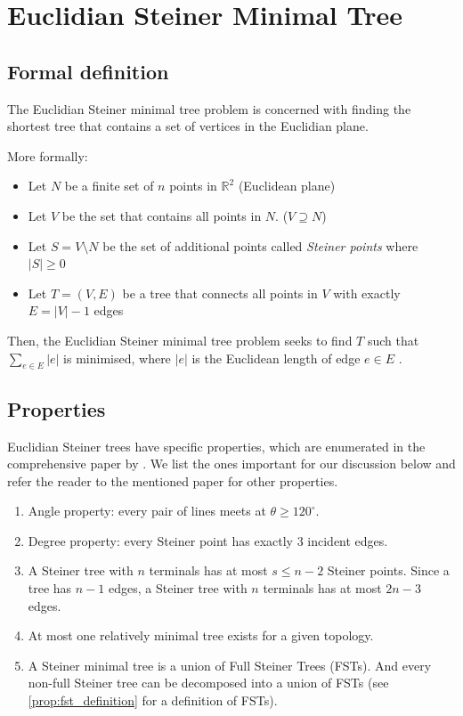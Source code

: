 \documentclass{l4proj}
\begin{document}
\section{Euclidian Steiner Minimal Tree}

\subsection{Formal definition}
The Euclidian Steiner minimal tree problem is concerned with finding the shortest tree that contains a set of vertices in the Euclidian plane.

More formally:
\begin{itemize}
    \item Let $N$ be a finite set of $n$ points in $\mathbb{R}^2$ (Euclidean plane)
    \item Let $V$ be the set that contains all points in $N$. ($V \supseteq N$)
    \item Let $S = V \setminus N$ be the set of additional points called \textit{Steiner points} where $|S| \geq 0$
    \item Let $T = (V, E)$ be a tree that connects all points in $V$ with exactly $E = |V| - 1$ edges
\end{itemize}

Then, the Euclidian Steiner minimal tree problem seeks to find $T$ such that $\sum_{e \in E} |e|$ is minimised, where $|e|$ is the Euclidean length of edge $e \in E$ \citep{Brazil2014}.

\subsection{Properties}
\label{sec:esmt_properties}
Euclidian Steiner trees have specific properties, which are enumerated in the comprehensive paper by \cite{Gilbert1968SteinerMT}. We list the ones important for our discussion below and refer the reader to the mentioned paper for other properties.

\begin{enumerate}
    \item Angle property: every pair of lines meets at $\theta \geq 120^\circ$.
    \item Degree property: every Steiner point has exactly 3 incident edges.
    \item \label{prop:esmt_fst} A Steiner tree with $n$ terminals has at most $s \leq n - 2$ Steiner points. Since a tree has $n - 1$ edges, a Steiner tree with $n$ terminals has at most $2n - 3$ edges.
    \item At most one relatively minimal tree exists for a given topology.
    \item \label{prop:smt_fst} A Steiner minimal tree is a union of Full Steiner Trees (FSTs). And every non-full Steiner tree can be decomposed into a union of FSTs (see \ref{prop:fst_definition} for a definition of FSTs).
\end{enumerate}
\end{document}
